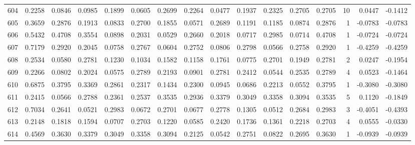 \begin{tabular}{lrrrrrrrrrrrrrrr}
604 &      0.2258 &  0.0846 &  0.0985 &  0.1899 &  0.0605 &  0.2699 &  0.2264 &  0.0477 &  0.1937 &  0.2325 &   0.2705 &     0.2705 &     10 &                    0.0447 &                    -0.1412 \\
605 &      0.3659 &  0.2876 &  0.1913 &  0.0833 &  0.2700 &  0.1855 &  0.0571 &  0.2689 &  0.1191 &  0.1185 &   0.0874 &     0.2876 &      1 &                   -0.0783 &                    -0.0783 \\
606 &      0.5432 &  0.4708 &  0.3554 &  0.0898 &  0.2031 &  0.0529 &  0.2660 &  0.2018 &  0.0717 &  0.2985 &   0.0714 &     0.4708 &      1 &                   -0.0724 &                    -0.0724 \\
607 &      0.7179 &  0.2920 &  0.2045 &  0.0758 &  0.2767 &  0.0604 &  0.2752 &  0.0806 &  0.2798 &  0.0566 &   0.2758 &     0.2920 &      1 &                   -0.4259 &                    -0.4259 \\
608 &      0.2534 &  0.0580 &  0.2781 &  0.1230 &  0.1034 &  0.1582 &  0.1158 &  0.1761 &  0.0775 &  0.2701 &   0.1949 &     0.2781 &      2 &                    0.0247 &                    -0.1954 \\
609 &      0.2266 &  0.0802 &  0.2024 &  0.0575 &  0.2789 &  0.2193 &  0.0901 &  0.2781 &  0.2412 &  0.0544 &   0.2535 &     0.2789 &      4 &                    0.0523 &                    -0.1464 \\
610 &      0.6875 &  0.3795 &  0.3369 &  0.2861 &  0.2317 &  0.1434 &  0.2300 &  0.0945 &  0.0686 &  0.2213 &   0.0552 &     0.3795 &      1 &                   -0.3080 &                    -0.3080 \\
611 &      0.2415 &  0.0566 &  0.2788 &  0.2361 &  0.2537 &  0.3535 &  0.2936 &  0.3379 &  0.3049 &  0.3358 &   0.3094 &     0.3535 &      5 &                    0.1120 &                    -0.1849 \\
612 &      0.7034 &  0.2641 &  0.0521 &  0.2983 &  0.0672 &  0.2701 &  0.0677 &  0.2778 &  0.1305 &  0.0512 &   0.2684 &     0.2983 &      3 &                   -0.4051 &                    -0.4393 \\
613 &      0.2148 &  0.1818 &  0.1594 &  0.0707 &  0.2703 &  0.1220 &  0.0585 &  0.2420 &  0.1736 &  0.1361 &   0.2218 &     0.2703 &      4 &                    0.0555 &                    -0.0330 \\
614 &      0.4569 &  0.3630 &  0.3379 &  0.3049 &  0.3358 &  0.3094 &  0.2125 &  0.0542 &  0.2751 &  0.0822 &   0.2695 &     0.3630 &      1 &                   -0.0939 &                    -0.0939 \\

\end{tabular}
